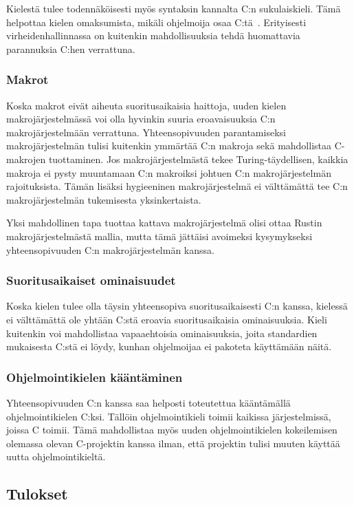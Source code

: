 Kielestä tulee todennäköisesti myös syntaksin kannalta C:n sukulaiskieli. Tämä
helpottaa kielen omaksumista, mikäli ohjelmoija osaa
C:tä~\citep{languagelearning}. Erityisesti virheidenhallinnassa on kuitenkin
mahdollisuuksia tehdä huomattavia parannuksia C:hen verrattuna.

\subsubsection{Makrot}

Koska makrot eivät aiheuta suoritusaikaisia haittoja, uuden kielen
makrojärjestelmässä voi olla hyvinkin suuria eroavaisuuksia C:n
makrojärjestelmään verrattuna. Yhteensopivuuden parantamiseksi
makrojärjestelmän tulisi kuitenkin ymmärtää C:n makroja sekä mahdollistaa
C-makrojen tuottaminen. Jos makrojärjestelmästä tekee Turing-täydellisen,
kaikkia makroja ei pysty muuntamaan C:n makroiksi johtuen C:n makrojärjestelmän
rajoituksista. Tämän lisäksi hygieeninen makrojärjestelmä ei välttämättä tee
C:n makrojärjestelmän tukemisesta yksinkertaista.

Yksi mahdollinen tapa tuottaa kattava makrojärjestelmä olisi ottaa Rustin
makrojärjestelmästä mallia, mutta tämä jättäisi avoimeksi kysymykseksi
yhteensopivuuden C:n makrojärjestelmän kanssa.

\subsubsection{Suoritusaikaiset ominaisuudet}

Koska kielen tulee olla täysin yhteensopiva suoritusaikaisesti C:n kanssa,
kielessä ei välttämättä ole yhtään C:stä eroavia suoritusaikaisia
ominaisuuksia. Kieli kuitenkin voi mahdollistaa vapaaehtoisia ominaisuuksia,
joita standardien mukaisesta C:stä ei löydy, kunhan ohjelmoijaa ei pakoteta
käyttämään näitä.

\subsubsection{Ohjelmointikielen kääntäminen}

Yhteensopivuuden C:n kanssa saa helposti toteutettua kääntämällä
ohjelmointikielen C:ksi. Tällöin ohjelmointikieli toimii kaikissa
järjestelmissä, joissa C toimii. Tämä mahdollistaa myös uuden ohjelmointikielen
kokeilemisen olemassa olevan C-projektin kanssa ilman, että projektin tulisi
muuten käyttää uutta ohjelmointikieltä.

\subsection{Tulokset}

